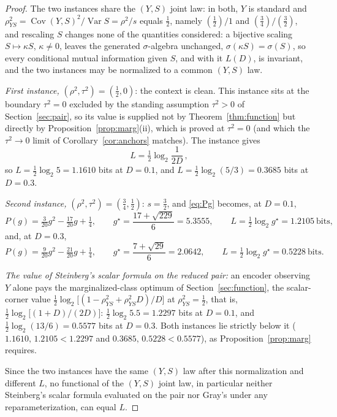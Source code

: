 \documentclass[11pt,onecolumn]{IEEEtran}
\newcommand{\Cov}{\operatorname{Cov}}
\begin{document}
\begin{proof}
The two instances share the $(Y,S)$ joint law: in both, $Y$ is standard
and
$\rho_{YS}^2=\Cov(Y,S)^2/\operatorname{Var}S=\rho^2/s$ equals
$\tfrac12$, namely $(\tfrac12)/1$ and $(\tfrac34)/(\tfrac32)$, and
rescaling $S$ changes none of the quantities considered: a bijective
scaling $S\mapsto\kappa S$, $\kappa\ne0$, leaves the generated
$\sigma$-algebra unchanged, $\sigma(\kappa S)=\sigma(S)$, so every
conditional mutual information given $S$, and with it $L(D)$, is
invariant, and the two instances may be normalized to a common
$(Y,S)$ law.

\emph{First instance,} $(\rho^2,\tau^2)=(\tfrac12,0)$: the context is
clean. This instance sits at the boundary $\tau^2=0$ excluded by the
standing assumption $\tau^2>0$ of Section~\ref{sec:pair}, so its value
is supplied not by Theorem~\ref{thm:function} but directly by
Proposition~\ref{prop:marg}(ii), which is proved at $\tau^2=0$ (and
which the $\tau^2\to0$ limit of Corollary~\ref{cor:anchors} matches). The instance gives
\[
L=\tfrac12\log_2\frac{1}{2D}\,,
\]
so $L=\tfrac12\log_2 5=1.1610$ bits
at $D=0.1$, and $L=\tfrac12\log_2(5/3)=0.3685$ bits at $D=0.3$.

\emph{Second instance,} $(\rho^2,\tau^2)=(\tfrac34,\tfrac12)$:
$s=\tfrac32$, and \eqref{eq:Pg} becomes, at $D=0.1$,
\[
P(g)=\tfrac{3}{20}g^2-\tfrac{17}{20}g+\tfrac14,
\qquad
g^\star=\frac{17+\sqrt{229}}{6}=5.3555,
\qquad
L=\tfrac12\log_2 g^\star=1.2105\ \text{bits},
\]
and, at $D=0.3$,
\[
P(g)=\tfrac{9}{20}g^2-\tfrac{21}{20}g+\tfrac14,
\qquad
g^\star=\frac{7+\sqrt{29}}{6}=2.0642,
\qquad
L=\tfrac12\log_2 g^\star=0.5228\ \text{bits}.
\]

\emph{The value of Steinberg's scalar formula on the reduced pair:} an
encoder observing $Y$
alone pays the marginalized-class optimum of
Section~\ref{sec:function}, the scalar-corner value
$\tfrac12\log_2\bigl[(1-\rho_{YS}^2+\rho_{YS}^2D)/D\bigr]$ at
$\rho_{YS}^2=\tfrac12$, that is,
$\tfrac12\log_2\bigl[(1+D)/(2D)\bigr]$: $\tfrac12\log_2 5.5=1.2297$
bits at $D=0.1$, and $\tfrac12\log_2(13/6)=0.5577$ bits at $D=0.3$.
Both instances lie strictly below it ($1.1610,\,1.2105<1.2297$ and
$0.3685,\,0.5228<0.5577$), as Proposition~\ref{prop:marg} requires.

Since the two instances have the same $(Y,S)$ law after this
normalization and different $L$, no functional of the $(Y,S)$ joint
law, in particular neither Steinberg's scalar formula evaluated on the
pair nor Gray's under any reparameterization, can equal $L$.
\end{proof}
\end{document}
